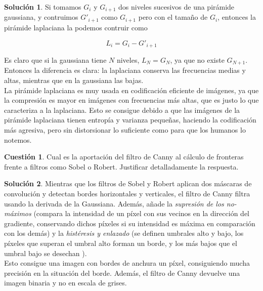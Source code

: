 \documentclass[a4paper, 11pt]{article}
\theoremstyle{definition}
\newtheorem{cuestion}{Cuestión}
\newtheorem*{solucion}{Solución}
\begin{document}
  \begin{solucion}
     	Si tomamos $G_i$ y $G_{i+1}$ dos niveles sucesivos de una pirámide gaussiana,
      y contruimos $G'_{i+1}$ como $G_{i+1}$ pero con el tamaño de $G_i$, entonces
      la pirámide laplaciana la podemos contruir como

      $$L_i = G_i - G'_{i+1}$$

      Es claro que si la gaussiana tiene $N$ niveles, $L_N = G_N$, ya que no existe
      $G_{N+1}$. Entonces la diferencia es clara: la laplaciana conserva las
      frecuencias medias y altas, mientras que en la gaussiana las bajas. \\

      La pirámide laplaciana es muy usada en codificación eficiente de imágenes,
      ya que la compresión es mayor en imágenes con frecuencias más altas, que es
      justo lo que caracteriza a la laplaciana. Esto se consigue debido a que las
      imágenes de la pirámide laplaciana tienen entropía y varianza pequeñas,
      haciendo la codificación más agresiva, pero sin distorsionar lo suficiente
      como para que los humanos lo notemos.
  \end{solucion}

  \begin{cuestion}
     	Cual es la aportación del filtro de Canny al cálculo de fronteras
      frente a filtros como Sobel o Robert. Justificar detalladamente la
      respuesta.
  \end{cuestion}

  \begin{solucion}
     	Mientras que los filtros de Sobel y Robert aplican dos máscaras de convolución
      y detectan bordes horizontales y verticales, el filtro de Canny filtra usando
      la derivada de la Gaussiana. Además, añade la \textit{supresión de los no-máximos}
      (compara la intensidad de un píxel con sus vecinos en la dirección del gradiente,
      conservando dichos píxeles si su intensidad es máxima en comparación con los demás)
      y la \textit{histéresis y enlazado} (se definen umbrales alto y bajo, los píxeles
      que superan el umbral alto forman un borde, y los más bajos que el umbral bajo
      se desechan ). \\

      Esto consigue una imagen con bordes de anchura un píxel, consiguiendo mucha precisión
      en la situación del borde. Además, el filtro de Canny devuelve una imagen
      binaria y no en escala de grises.
  \end{solucion}
\end{document}
